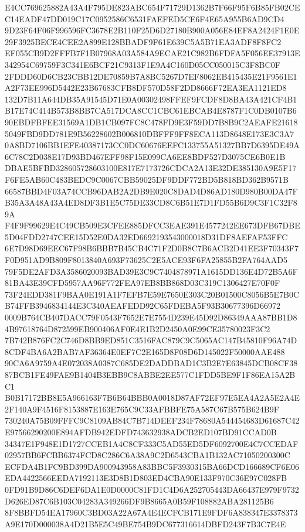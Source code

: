 \documentclass[UTF8,fontset=fandol,zihao=-4,a4paper]{ctexart}
\begin{document}
{{E4CC769625882A43A4F795DE823ABC654F71729D1362B7F66F95F6B85FB02CEC14EADF47DD019C17C0952586C6531FAEFED5CE6F4E65A955B6AD9CD4
9D23F64F06F996596FC3678E2B110F25D6D27180B900A056E84EF8A2424F1E0E29F3925BECE4CEE2A899E128BBADF9F61E639C5A5B71EA3ADF8F8FC2
EF055CB9D2FFFB7F1B07968A03A584A9ECAE21C982B6FDFA5F056EE37913E342954C69759F3C341E6BCF21C9313F1E9A4C160D05CC050015C3F8BC0F
2FDDD60D6CB23CBB12DE70859B7A8BC5267D7EF8062EB415435E21F9561E1A2F73EE996D5442E23B67683CFB8DF570D58F2DD8666F72EA3EA1121ED8
132D7B11A644DB35A91545D71E0A00302498FFEF9FCDF8D8BA43A421CF4B1B17E74C414B573B8BB7CA517DCA8CC1CBC61EBCAB4E8787F1C0DB0107B6
90EBDFBFEE31569A1DB1CB097FC8C478FD9E3F59DD7B8B9C2AEAFE216185049FBD9DD781E9B56228602B006810DBFFF9FF8ECA113D8648E173E3C3A7
0A8BD7106BB1EFE40387173CC0DC60676EEFC133755A51327BB7D6395DE49A6C78C2D038E17D93BD467EFF98F15E099CA6EE8BDF527D3075CE6B0E1B
DBAE5BFBD328605728603100E817E7173726CDCA2A13E32DE385130A9E5F17F6FE5AB60C483BEDC9C0067CBB59025DF9DDF772BD5B818BD362B9571B
66587BBD4F03A74CCB96DAB2A2DB9E020C8DAD4D86AD180D980B00DA47FB35A3A48A43A4ED8DF3B1E5C75DE33CD8C6B51E7D1FD55B6D9C3F1C32F89A
F4F9F99629E4C49CB509E3CFEE885DFCC3EAE391E4577242EE673DFB67DBE5D04FDD2747CEE15D52E0DA32ED6692193543000018D31DF8AEFAF53FFC
6E7D98D69EEC67F98B6BBB7B45CB4C71F2D0B8C7B6ACB2D41EE3F70343F7F0D951AD9B809F8013840A693F73625C2E5ACE93F6FA25855B2FA764AAD5
79F5DE2AFD3A3586020093BAD39E3C9C7404878971A1615DD136E4D72B5A6F81BA43E39CFD5957AA96F772FEA97EB8BB868D03C319C1306427E70F0F
73F24EDD381F9BAA0E191A1F7EFB7E59E7650E303C20B01500C8056B5E7B0CB74FFB3946834144E3C340AEAFEDD92C65FDEBA5F93B30677396D66972
0009B764CB407DACC79F0543F7652E7E7554D239E45D92D86349AAA87BB1D84B97618764D872599EB900406AF0E4E1B2D2450A0E99CE35780023F3C2
7B742B876FC2C746D8BB9ED851C3516FAC879C9C5065AC147B45810F96A74D8CDF4BA6A2BAB7AF36364E0EF7C2E165D8F08D6D145022F50000AAE488
90CA6A9759A4E072038A0387C685DE2DADDBAD1C3B2E7E63845DCB08CF3887BCB1FE49FAE9B1404B3EBB9C8ABBE2EE577C1FDD5BE9F1F86EA15A2BC1
B0B17172BB8E5A966163F7B6B64BBB0A0018D87AF72EF97E5EA4A2A5E2A4E2F140A9F4516F8153887E163E765C9C33AFBBFE75A587C67B575B624B9F
730240A75B09FFFC9C8109AB84C7B714DEEF234F78680A544454683D61687C42E97566290200E894AFDB942EDFD743632938ADCB2ED107BD91CCAD0B
34347E1F948E1D1727CCEB1A4C8CF333C5AD55ED5DF6092700E4C7CCEDAF02957BB6FCBB6374FCD8C286C6A38A9C2D6543CBA1B132AC71050200300C
ECFDA4B1FC9BD399DA900943958A83BBC5F3930315BA66DCD166689CF6E06EDA4422566EEDA7192113E3D8B1D803ED4CBA90E133F970C36E97C028FB
0FD91B9D86C6DEF6DA1E0D0000C81FD1C4D6A252705443DA66437E979F9732D626ED87C6B103C04283A349266DF9B8665A0B59F108882ABA281125B6
8F8BBFD54EA17960C3BD03A22A67A4E4ECFCB171E9FDF6A838347E3378373A9E170D000038A4D21B5E5C49BE754B9DC677316614DBFD243F7B3C7E4E
}}
\end{document}
